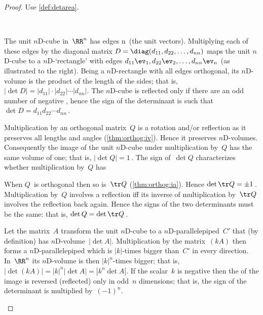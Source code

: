 \begin{proof} Use \cref{def:detarea}.
\begin{description}
\item[\ref{thm:basicdet:i}]\ \\
\begin{figbox}{\def\unithouseviews{30}}%
The unit $n$D-cube in~\(\RR^n\) has edges \hlist\ev n\ (the unit vectors).
Multiplying each of these edges by the diagonal matrix \(D=\diag(d_{11},d_{22},\ldots,d_{nn})\) maps the unit $n$D-cube to a $n$D-`rectangle' with edges \(d_{11}\ev_1,d_{22}\ev_2,\ldots,d_{nn}\ev_n\) (as illustrated to the right).
Being a $n$D-rectangle with all edges orthogonal, its $n$D-volume is the product of the length of the sides; that is, \(|\det D|=|d_{11}|\cdot|d_{22}|\cdots |d_{nn}|\).
The $n$D-cube is reflected only if there are an odd number of negative , hence the sign of the determinant is such that \(\det D=d_{11}d_{22}\cdots d_{nn}\)\,.

\end{figbox}

\item[\ref{thm:basicdet:ii}]
Multiplication by an orthogonal matrix~\(Q\) is a rotation and/or reflection as it preserves all lengths and angles (\cref{thm:orthog:iv}).
Hence it preserves $n$D-volumes.
Consequently the image of the unit $n$D-cube under multiplication by~\(Q\) has the same volume of one; that is, \(|\det Q|=1\)\,.
The sign of~\(\det Q\) characterizes whether multiplication by~\(Q\) has 

When \(Q\)~is orthogonal then so is~\(\tr Q\) (\cref{thm:orthog:ia}).  Hence \(\det\tr Q=\pm1\)\,.
Multiplication by~\(Q\) involves a reflection iff its inverse of multiplication by~\(\tr Q\) involves the reflection back again.
Hence the signs of the two determinants must be the same: that is, \(\det Q=\det\tr Q\)\,.

\item[\ref{thm:basicdet:iii}]
Let the matrix~\(A\) transform the unit $n$D-cube to a $n$D-parallelepiped~\(C'\) that  (by definition) has $n$D-volume~\(|\det A|\).
Multiplication by the matrix~\((kA)\) then forms a $n$D-parallelepiped which is \(|k|\)-times bigger than~\(C'\) in every direction.
In~\(\RR^n\) its $n$D-volume is then \(|k|^n\)-times bigger; that is,
\(|\det(kA)|=|k|^n|\det A|=|k^n\det A|\).
If the scalar~\(k\) is negative then the  of the image is reversed (reflected) only in odd~\(n\) dimensions; that is, the sign of the determinant is multiplied by~\((-1)^n\).


\end{description}
\end{proof}
